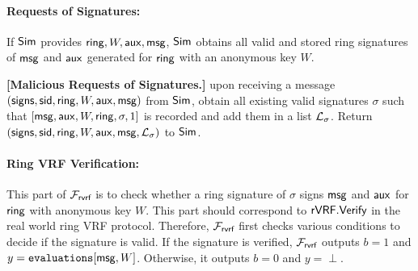 \paragraph{Requests of  Signatures:} If $ \mathsf{Sim} $ provides $ \mathsf{ring},W, \mathsf{aux}, \mathsf{msg}$, $ \mathsf{Sim} $  obtains all valid and stored ring signatures of $ \mathsf{msg} $ and $ \mathsf{aux} $ generated for $ \mathsf{ring} $ with an anonymous key $ W $.  

\begin{tcolorbox}[left=2pt,right=2pt]
	\eprint{}{\scriptsize}
	\textbf{[Malicious Requests of  Signatures.]} upon receiving a message $ (\mathsf{signs}, \textsf{sid}, \mathsf{ring}, W, \mathsf{aux},\mathsf{msg}) $ from $ \mathsf{Sim} $, obtain all existing valid signatures $ \sigma $ such that $ [\mathsf{msg}, \mathsf{aux},W,\mathsf{ring},\sigma, 1] $ is recorded and add them in a list $ {\mathcal{L}}_{\sigma} $. 	Return $ (\mathsf{signs}, \textsf{sid}, \mathsf{ring}, W,\mathsf{aux},\mathsf{msg}, {\mathcal{L}}_{\sigma})  $ to $ \mathsf{Sim} $.
\end{tcolorbox}




\paragraph{Ring VRF Verification:} This part of $ \mathcal{F}_{\textsf{rvrf}} $ is to check whether a ring signature of $ \sigma $ signs $ \mathsf{msg} $ and $ \mathsf{aux} $ for $ \mathsf{ring} $ with anonymous key $ W $. This part should correspond to $ {\mathsf{rVRF}}.{\mathsf{Verify}} $ in the real world ring VRF protocol. Therefore,
$ \mathcal{F}_{\textsf{rvrf}} $ first checks various conditions to decide if the signature is valid. If the signature is verified, $ \mathcal{F}_{\textsf{rvrf}} $ outputs $ b = 1 $ and $ y = \texttt{evaluations}[\mathsf{msg}, W] $. Otherwise, it outputs $ b = 0 $ and $ y = \perp $. 


